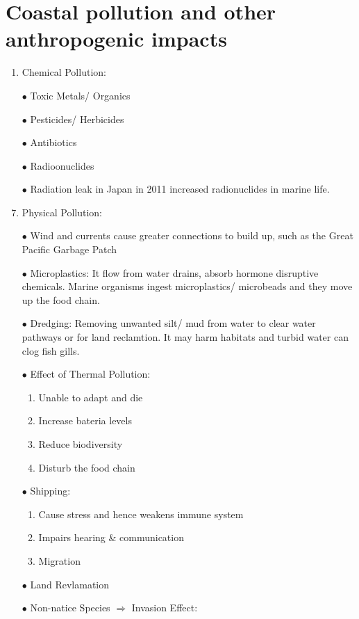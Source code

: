 \documentclass{report}
\begin{document}
\section{Coastal pollution and other anthropogenic impacts}
\begin{enumerate}
    \item Chemical Pollution:
    \item [$\bullet$]Toxic Metals/ Organics
    \item [$\bullet$]Pesticides/ Herbicides
    \item [$\bullet$]Antibiotics
    \item [$\bullet$]Radioonuclides
    \item [$\bullet$]Radiation leak in Japan in 2011 increased radionuclides in marine life.
    \item Physical Pollution:
    \item [$\bullet$]Wind and currents cause greater connections to build up, such as the Great Pacific Garbage Patch
    \item [$\bullet$]Microplastics: It flow from water drains, absorb hormone disruptive chemicals. Marine organisms ingest microplastics/ microbeads and they move up the food chain.
    \item [$\bullet$]Dredging: Removing unwanted silt/ mud from water to clear water pathways or for land reclamtion. It may harm habitats and turbid water can clog fish gills.
    \item [$\bullet$]Effect of Thermal Pollution:
    \begin{enumerate}
        \item Unable to adapt and die
        \item Increase bateria levels 
        \item Reduce biodiversity
        \item Disturb the food chain 
    \end{enumerate}
    \item [$\bullet$]Shipping:
    \begin{enumerate}
        \item Cause stress and hence weakens immune system
        \item Impairs hearing \& communication
        \item Migration
    \end{enumerate}
    \item [$\bullet$]Land Revlamation
    \item [$\bullet$]Non-natice Species $\Rightarrow$ Invasion Effect:
\end{enumerate}
\end{document}
